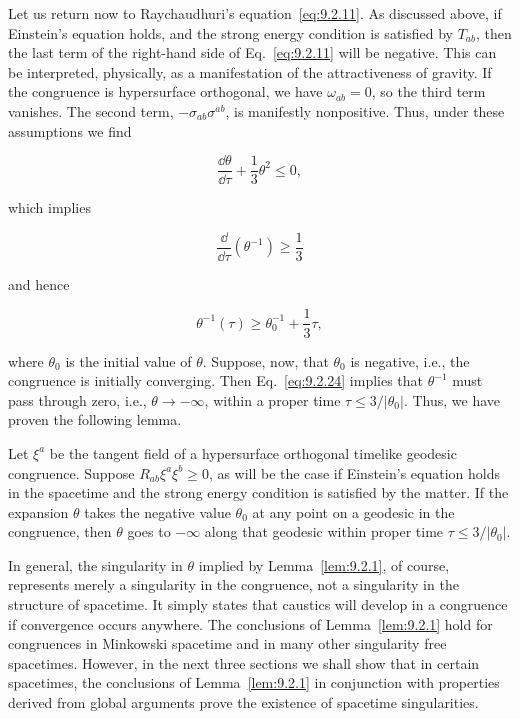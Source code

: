 Let us return now to Raychaudhuri's equation~\eqref{eq:9.2.11}. As discussed above,
if Einstein's equation holds, and the strong energy condition is satisfied by \(T_{ab}\),
then the last term of the right-hand side of Eq.~\eqref{eq:9.2.11} will be negative.
This can be interpreted, physically, as a manifestation of the attractiveness of
gravity. If the congruence is hypersurface orthogonal, we have \(\omega_{ab}=0\), so
the third term vanishes. The second term, \(-\sigma_{ab}\sigma^{ab}\), is manifestly
nonpositive. Thus, under these assumptions we find

\begin{equation}
  \frac{\dd\theta}{\dd\tau}+\frac13\theta^2\leq0 ,
  \tag{9.2.22}\label{eq:9.2.22}
\end{equation}

which implies

\begin{equation}
  \frac{\dd}{\dd\tau}(\theta^{-1})\geq\frac13
  \tag{9.2.23}\label{eq:9.2.23}
\end{equation}

and hence

\begin{equation}
  \theta^{-1}(\tau)\geq\theta_0^{-1}+\frac13\tau ,
  \tag{9.2.24}\label{eq:9.2.24}
\end{equation}

where \(\theta_0\) is the initial value of \(\theta\). Suppose, now, that \(\theta_0\)
is negative, i.e., the congruence is initially converging. Then Eq.~\eqref{eq:9.2.24}
implies that \(\theta^{-1}\) must pass through zero, i.e., \(\theta\to-\infty\), within a
proper time \(\tau\leq3/\lvert\theta_0\rvert\). Thus, we have proven the following lemma.

\begin{lemma}\label{lem:9.2.1}
Let \(\xi^a\) be the tangent field of a hypersurface orthogonal timelike geodesic
congruence. Suppose \(R_{ab}\xi^a\xi^b\geq0\), as will be the case if Einstein's
equation holds in the spacetime and the strong energy condition is satisfied by
the matter. If the expansion \(\theta\) takes the negative value \(\theta_0\) at any
point on a geodesic in the congruence, then \(\theta\) goes to \(-\infty\) along that
geodesic within proper time \(\tau\leq3/\lvert\theta_0\rvert\).
\end{lemma}

In general, the singularity in \(\theta\) implied by Lemma~\ref{lem:9.2.1}, of course,
represents merely a singularity in the congruence, not a singularity in the structure
of spacetime. It simply states that caustics will develop in a congruence if convergence
occurs anywhere. The conclusions of Lemma~\ref{lem:9.2.1} hold for congruences in
Minkowski spacetime and in many other singularity free spacetimes. However, in the
next three sections we shall show that in certain spacetimes, the conclusions of
Lemma~\ref{lem:9.2.1} in conjunction with properties derived from global arguments
prove the existence of spacetime singularities.


